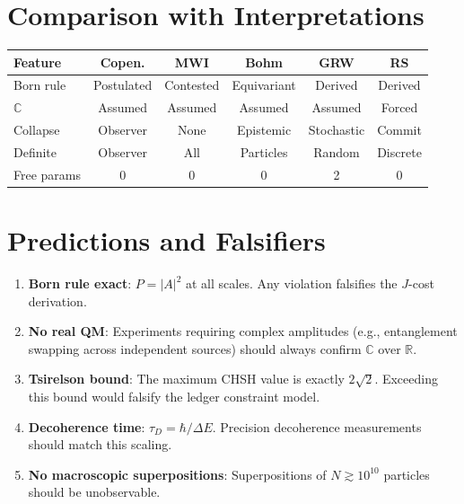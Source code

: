 \documentclass[12pt,a4paper]{article}
\theoremstyle{definition}
\theoremstyle{remark}
\begin{document}
\section{Comparison with Interpretations}
\label{sec:comparison}

\begin{center}
\renewcommand{\arraystretch}{1.3}
\begin{tabular}{lccccc}
\hline
\textbf{Feature} & \textbf{Copen.} & \textbf{MWI} &
\textbf{Bohm} & \textbf{GRW} & \textbf{RS} \\
\hline
Born rule & Postulated & Contested & Equivariant &
Derived & Derived \\
$\mathbb{C}$ & Assumed & Assumed & Assumed &
Assumed & Forced \\
Collapse & Observer & None & Epistemic &
Stochastic & Commit \\
Definite & Observer & All & Particles &
Random & Discrete \\
Free params & 0 & 0 & 0 & 2 & 0 \\
\hline
\end{tabular}
\end{center}

\section{Predictions and Falsifiers}
\label{sec:predictions}

\begin{enumerate}
  \item \textbf{Born rule exact}: $P = |A|^2$ at all scales.  Any
  violation falsifies the $J$-cost derivation.

  \item \textbf{No real QM}: Experiments requiring complex
  amplitudes (e.g., entanglement swapping across independent
  sources) should always confirm $\mathbb{C}$ over $\mathbb{R}$.

  \item \textbf{Tsirelson bound}: The maximum CHSH value is
  exactly $2\sqrt{2}$.  Exceeding this bound would falsify the
  ledger constraint model.

  \item \textbf{Decoherence time}: $\tau_D = \hbar/\Delta E$.
  Precision decoherence measurements should match this scaling.

  \item \textbf{No macroscopic superpositions}: Superpositions of
  $N \gtrsim 10^{10}$ particles should be unobservable.
\end{enumerate}
\end{document}
